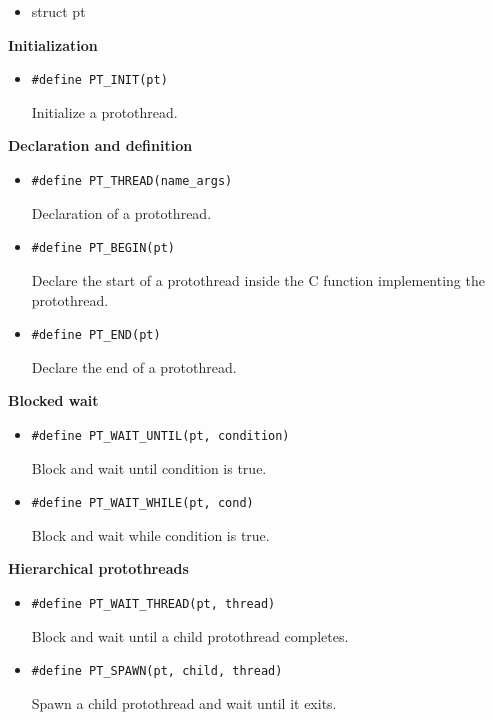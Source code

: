 \documentclass[12pt]{article}
\begin{document}
\begin{CJK}{UTF8}{bsmi}
\begin{itemize}
\item struct pt
\end{itemize}

\bf Initialization

\begin{itemize}
\item \verb+#define PT_INIT(pt)+

Initialize a protothread.
\end{itemize}


\bf Declaration and definition

\begin{itemize}
\item \verb+#define PT_THREAD(name_args)+

Declaration of a protothread.

\item \verb+#define PT_BEGIN(pt)+

Declare the start of a protothread inside the C function implementing the protothread.

\item \verb+#define PT_END(pt)+

Declare the end of a protothread.

\end{itemize}


\bf Blocked wait

\begin{itemize}
\item \verb+#define PT_WAIT_UNTIL(pt, condition)+

Block and wait until condition is true.

\item \verb+#define PT_WAIT_WHILE(pt, cond)+

Block and wait while condition is true.
\end{itemize}

\bf Hierarchical protothreads

\begin{itemize}
\item \verb+#define PT_WAIT_THREAD(pt, thread)+

Block and wait until a child protothread completes.

\item \verb+#define PT_SPAWN(pt, child, thread)+

Spawn a child protothread and wait until it exits.
\end{itemize}


\end{CJK}
\end{document}
